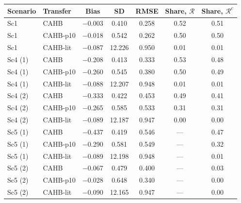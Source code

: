 \documentclass[11pt]{article}
\theoremstyle{definition}
\theoremstyle{plain}
\begin{document}
{\color{blue}
\begin{center}\scriptsize
\begin{tabular}{llccccc}
\toprule
Scenario & Transfer & Bias & SD & RMSE & Share, $\mathcal R$ & Share, $\mathcal R^c$ \\
\midrule
Sc1 & CAHB & $-$0.003 & 0.410 & 0.258 & 0.52 & 0.51 \\
Sc1 & CAHB-p10 & $-$0.018 & 0.542 & 0.262 & 0.50 & 0.50 \\
Sc1 & CAHB-lit & $-$0.087 & 12.226 & 0.950 & 0.01 & 0.01 \\
Sc4 (1) & CAHB & $-$0.208 & 0.413 & 0.333 & 0.53 & 0.48 \\
Sc4 (1) & CAHB-p10 & $-$0.260 & 0.545 & 0.380 & 0.50 & 0.49 \\
Sc4 (1) & CAHB-lit & $-$0.088 & 12.207 & 0.948 & 0.01 & 0.01 \\
Sc4 (2) & CAHB & $-$0.333 & 0.422 & 0.453 & 0.49 & 0.41 \\
Sc4 (2) & CAHB-p10 & $-$0.265 & 0.585 & 0.533 & 0.31 & 0.31 \\
Sc4 (2) & CAHB-lit & $-$0.089 & 12.187 & 0.947 & 0.00 & 0.00 \\
Sc5 (1) & CAHB & $-$0.437 & 0.419 & 0.546 & --- & 0.47 \\
Sc5 (1) & CAHB-p10 & $-$0.290 & 0.581 & 0.549 & --- & 0.32 \\
Sc5 (1) & CAHB-lit & $-$0.089 & 12.198 & 0.948 & --- & 0.01 \\
Sc5 (2) & CAHB & $-$0.067 & 0.479 & 0.400 & --- & 0.03 \\
Sc5 (2) & CAHB-p10 & $-$0.028 & 0.648 & 0.340 & --- & 0.00 \\
Sc5 (2) & CAHB-lit & $-$0.090 & 12.165 & 0.947 & --- & 0.00 \\
\bottomrule
\end{tabular}
\end{center}

}
\end{document}
